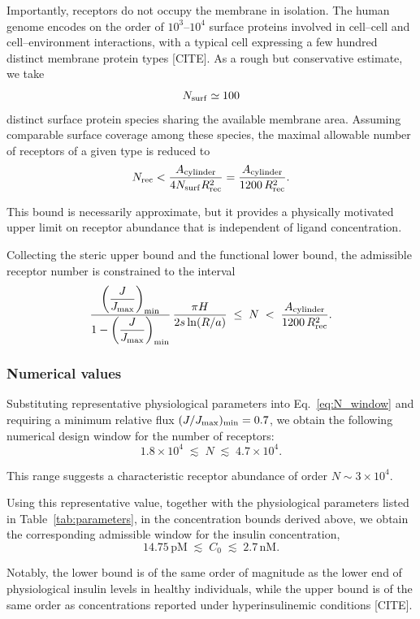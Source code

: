 Importantly, receptors do not occupy the membrane in isolation.
The human genome encodes on the order of $10^{3}$--$10^{4}$ surface proteins involved in cell--cell and cell--environment interactions, with a typical cell expressing a few hundred distinct membrane protein types [CITE].
As a rough but conservative estimate, we take
\begin{equation}
    N_{\mathrm{surf}} \simeq 100
    \label{eq:Nsurf}
\end{equation}
distinct surface protein species sharing the available membrane area.
Assuming comparable surface coverage among these species, the maximal allowable number of receptors of a given type is reduced to
\begin{equation}
    N_{\mathrm{rec}} < \frac{A_{\mathrm{cylinder}}}{4 N_{\mathrm{surf}} R_{\mathrm{rec}}^{2}} = \frac{A_{\mathrm{cylinder}}}{1200\,R_{\mathrm{rec}}^{2}}.
    \label{eq:N_upper}
\end{equation}

This bound is necessarily approximate, but it provides a physically motivated upper limit on receptor abundance that is independent of ligand concentration.

Collecting the steric upper bound and the functional lower bound, the admissible receptor number is constrained to the interval
\begin{equation}
    \frac{\left(\dfrac{J}{J_{\mathrm{max}}}\right)_{\min}}{1 - \left(\dfrac{J}{J_{\mathrm{max}}}\right)_{\min}}\,\frac{\pi H}{2 s \ln(R/a)} \;\le\; N \;<\; \frac{A_{\mathrm{cylinder}}}{1200\,R_{\mathrm{rec}}^{2}}.
    \label{eq:N_window}
\end{equation}

\subsubsection{Numerical values}\label{sec:numerical_values}
Substituting representative physiological parameters into Eq.~\eqref{eq:N_window} and requiring a minimum relative flux $(J/J_{\mathrm{max}})_{\min} = 0.7$, we obtain the following numerical design window for the number of receptors:
\begin{equation}
    1.8 \times 10^{4} \;\lesssim\; N \;\lesssim\; 4.7 \times 10^{4}.
    \label{eq:N_numerical}
\end{equation}

This range suggests a characteristic receptor abundance of order $N \sim 3 \times 10^{4}$.

Using this representative value, together with the physiological parameters listed in Table~\ref{tab:parameters}, in the concentration bounds derived above, we obtain the corresponding admissible window for the insulin concentration,
\begin{equation}
    14.75\,\mathrm{pM} \;\lesssim\; C_{0} \;\lesssim\; 2.7\,\mathrm{nM}.
    \label{eq:C0_numerical}
\end{equation}

Notably, the lower bound is of the same order of magnitude as the lower end of physiological insulin levels in healthy individuals, while the upper bound is of the same order as concentrations reported under hyperinsulinemic conditions [CITE].
